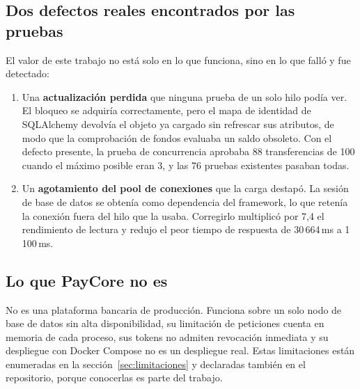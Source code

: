 \subsection*{Dos defectos reales encontrados por las pruebas}

El valor de este trabajo no está solo en lo que funciona, sino en lo que falló
y fue detectado:

\begin{enumerate}[leftmargin=1.4em]
  \item Una \textbf{actualización perdida} que ninguna prueba de un solo hilo
    podía ver. El bloqueo  se adquiría
    correctamente, pero el mapa de identidad de SQLAlchemy devolvía el objeto
    ya cargado sin refrescar sus atributos, de modo que la comprobación de
    fondos evaluaba un saldo obsoleto. Con el defecto presente, la prueba de
    concurrencia aprobaba 88 transferencias de 100 cuando el máximo posible
    eran 3, y las 76 pruebas existentes pasaban todas.
  \item Un \textbf{agotamiento del pool de conexiones} que la carga destapó.
    La sesión de base de datos se obtenía como dependencia del framework, lo
    que retenía la conexión fuera del hilo que la usaba. Corregirlo multiplicó
    por 7,4 el rendimiento de lectura y redujo el peor tiempo de respuesta de
    30\,664\,ms a 1\,100\,ms.
\end{enumerate}

\subsection*{Lo que PayCore no es}

No es una plataforma bancaria de producción. Funciona sobre un solo nodo de
base de datos sin alta disponibilidad, su limitación de peticiones cuenta en
memoria de cada proceso, sus tokens no admiten revocación inmediata y su
despliegue con Docker Compose no es un despliegue real. Estas limitaciones
están enumeradas en la sección~\ref{sec:limitaciones} y declaradas también en
el repositorio, porque conocerlas es parte del trabajo.
